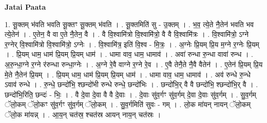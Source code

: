 \documentclass[17pt]{extarticle}
\begin{document}
\textbf{Jatai Paata} \newline

1. सू॒क्तम् भ॑वति भवति सू॒क्तꣳ सू॒क्तम् भ॑वति । . सू॒क्तमिति॑ सु - उ॒क्तम् । . भ॒व॒ त्ये॒ते नै॒तेन॑ भवति भव त्ये॒तेन॑ । . ए॒तेन॒ वै वा ए॒ते नै॒तेन॒ वै । . वै वि॒श्वामि॑त्रो वि॒श्वामि॑त्रो॒ वै वै वि॒श्वामि॑त्रः । . वि॒श्वामि॑त्रो॒ ऽग्ने र॒ग्नेर् वि॒श्वामि॑त्रो वि॒श्वामि॑त्रो॒ ऽग्नेः । . वि॒श्वामि॑त्र॒ इति॑ वि॒श्व - मि॒त्रः॒ । . अ॒ग्नेः प्रि॒यम् प्रि॒य म॒ग्ने र॒ग्नेः प्रि॒यम् । . प्रि॒यम् धाम॒ धाम॑ प्रि॒यम् प्रि॒यम् धाम॑ । . धामा वाव॒ धाम॒ धामाव॑ । . अवा॑ रुन्धा रु॒न्धा वावा॑ रुन्ध । . अ॒रु॒न्धा॒ग्ने र॒ग्ने र॑रुन्धा रुन्धा॒ग्नेः । . अ॒ग्ने रे॒वै वाग्ने र॒ग्ने रे॒व । . ए॒वै तेनै॒ते नै॒वै वैतेन॑ । . ए॒तेन॑ प्रि॒यम् प्रि॒य मे॒ते नै॒तेन॑ प्रि॒यम् । . प्रि॒यम् धाम॒ धाम॑ प्रि॒यम् प्रि॒यम् धाम॑ । . धामा वाव॒ धाम॒ धामाव॑ । . अव॑ रुन्धे रु॒न्धे ऽवाव॑ रुन्धे । . रु॒न्धे॒ छन्दो॑भि॒ श्छन्दो॑भी रुन्धे रुन्धे॒ छन्दो॑भिः । . छन्दो॑भि॒र् वै वै छन्दो॑भि॒ श्छन्दो॑भि॒र् वै । . छन्दो॑भि॒रिति॒ छन्दः॑ - भिः॒ । . वै दे॒वा दे॒वा वै वै दे॒वाः । . दे॒वाः सु॑व॒र्गꣳ सु॑व॒र्गम् दे॒वा दे॒वाः सु॑व॒र्गम् । . सु॒व॒र्गम् ॅलो॒कम् ॅलो॒कꣳ सु॑व॒र्गꣳ सु॑व॒र्गम् ॅलो॒कम् । . सु॒व॒र्गमिति॑ सुवः - गम् । . लो॒क मा॑यन् नायन् ॅलो॒कम् ॅलो॒क मा॑यन्न् । . आ॒य॒न् चत॑स्र॒ श्चत॑स्र आयन् नाय॒न् चत॑स्रः । \newline
\end{document}
